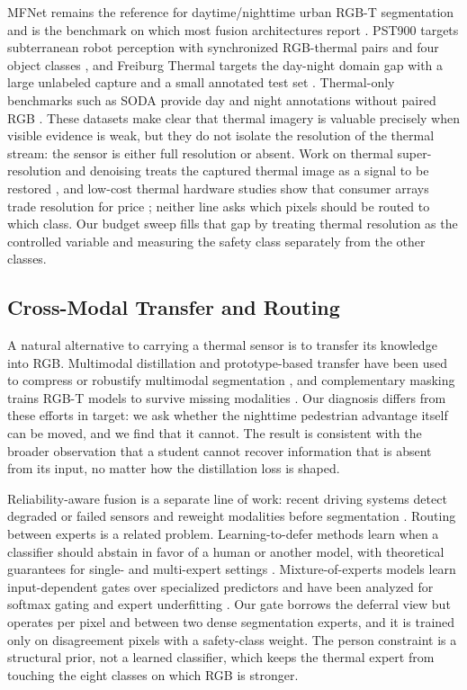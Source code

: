 MFNet remains the reference for daytime/nighttime urban RGB-T segmentation and is the
benchmark on which most fusion architectures report \cite{ha2017mfnet}. PST900 targets
subterranean robot perception with synchronized RGB-thermal pairs and four object
classes \cite{shivakumar2019rgbthermal}, and Freiburg Thermal targets the day-night
domain gap with a large unlabeled capture and a small annotated test set
\cite{vertens2020heatnet}. Thermal-only benchmarks such as SODA provide day and night
annotations without paired RGB \cite{li2019soda}. These datasets make clear that
thermal imagery is valuable precisely when visible evidence is weak, but they do not
isolate the resolution of the thermal stream: the sensor is either full resolution or
absent. Work on thermal super-resolution and denoising treats the captured thermal
image as a signal to be restored \cite{zou2025contourlet}, and
low-cost thermal hardware studies show that consumer arrays trade resolution for
price \cite{stoyanov2026feasibility,walczyk2026hardware}; neither line asks which
pixels should be routed to which class. Our budget sweep fills that gap by treating thermal resolution as the
controlled variable and measuring the safety class separately from the other classes.

\subsection{Cross-Modal Transfer and Routing}

A natural alternative to carrying a thermal sensor is to transfer its knowledge into
RGB. Multimodal distillation and prototype-based transfer have been used to compress
or robustify multimodal segmentation \cite{tan2025rmmss,wu2024fusionthendistillation},
and complementary masking trains RGB-T models to survive missing modalities
\cite{shin2023complementary}. Our diagnosis differs from these efforts in target: we
ask whether the nighttime pedestrian advantage itself can be moved, and we find that it
cannot. The result is consistent with the broader observation that a student cannot
recover information that is absent from its input, no matter how the distillation loss
is shaped.

Reliability-aware fusion is a separate line of work: recent driving systems detect
degraded or failed sensors and reweight modalities before segmentation
\cite{deregnaucourt2026reliabilityaware}. Routing between experts is a related
problem. Learning-to-defer methods learn
when a classifier should abstain in favor of a human or another model, with
theoretical guarantees for single- and multi-expert settings
\cite{mao2023principled,montreuil2025onestage,liu2026when}. Mixture-of-experts models
learn input-dependent gates over specialized predictors and have been analyzed for
softmax gating and expert underfitting \cite{bariletto2026bayesian,nguyen2025convergence}.
Our gate borrows the deferral view but operates per pixel and between two dense
segmentation experts, and it is trained only on disagreement pixels with a
safety-class weight. The person constraint is a structural prior, not a learned
classifier, which keeps the thermal expert from touching the eight classes on which
RGB is stronger.

